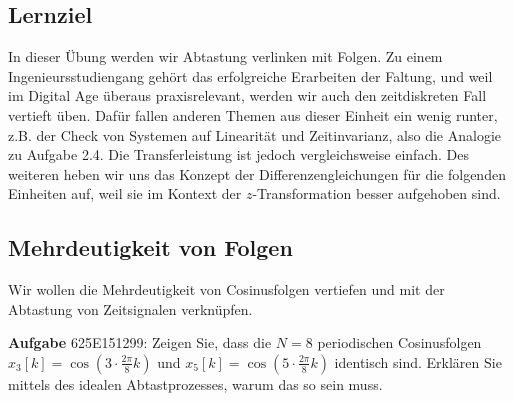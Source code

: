 \subsection*{Lernziel}
In dieser Übung werden wir Abtastung verlinken mit Folgen.
Zu einem Ingenieursstudiengang gehört das erfolgreiche Erarbeiten
der Faltung, und weil im Digital Age überaus praxisrelevant,
werden wir auch den zeitdiskreten Fall vertieft üben.
Dafür fallen anderen Themen aus dieser Einheit ein wenig runter, z.B.
der Check von Systemen auf Linearität und Zeitinvarianz, also die Analogie zu
Aufgabe 2.4. Die Transferleistung ist jedoch vergleichsweise einfach.
Des weiteren heben wir uns das Konzept der Differenzengleichungen für die folgenden
Einheiten auf, weil sie im Kontext der $z$-Transformation besser aufgehoben sind.


\newpage
\subsection{Mehrdeutigkeit von Folgen}
\label{sec:625E151299}
\begin{Ziel}
Wir wollen die Mehrdeutigkeit von Cosinusfolgen vertiefen und mit
der Abtastung von Zeitsignalen verknüpfen.
\end{Ziel}
\textbf{Aufgabe} {\tiny 625E151299}: Zeigen Sie, dass die $N=8$ periodischen
Cosinusfolgen $x_3[k] = \cos(3\cdot\frac{2\pi}{8}k)$ und
$x_5[k] = \cos(5\cdot\frac{2\pi}{8}k)$
identisch sind.
%
Erklären Sie mittels des idealen Abtastprozesses, warum das so sein muss.
%
\begin{center}
\end{center}

